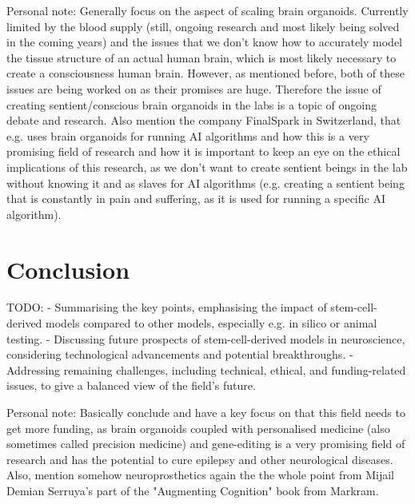 \documentclass[10pt]{article}
\begin{document}
\begin{sloppypar}
  Personal note: Generally focus on the aspect of scaling brain organoids. Currently limited by the blood supply (still, ongoing research and most likely being solved in the coming years) and the issues that we don't know how to accurately model the tissue structure of an actual human brain, which is most likely necessary to create a consciousness human brain. However, as mentioned before, both of these issues are being worked on as their promises are huge. Therefore the issue of creating sentient/conscious brain organoids in the labs is a topic of ongoing debate and research. Also mention the company FinalSpark in Switzerland, that e.g. uses brain organoids for running AI algorithms and how this is a very promising field of research and how it is important to keep an eye on the ethical implications of this research, as we don't want to create sentient beings in the lab without knowing it and as slaves for AI algorithms (e.g. creating a sentient being that is constantly in pain and suffering, as it is used for running a specific AI algorithm).

  \section{Conclusion}
  \label{sec:conclusion}

  TODO:
  - Summarising the key points, emphasising the impact of stem-cell-derived models compared to other models, especially e.g. in silico or animal testing.
  - Discussing future prospects of stem-cell-derived models in neuroscience, considering technological advancements and potential breakthroughs.
  - Addressing remaining challenges, including technical, ethical, and funding-related issues, to give a balanced view of the field's future.

  Personal note: Basically conclude and have a key focus on that this field needs to get more funding, as brain organoids coupled with personalised medicine (also sometimes called precision medicine) and gene-editing is a very promising field of research and has the potential to cure epilepsy and other neurological diseases. Also, mention somehow neuroprosthetics again the the whole point from Mijail Demian Serruya's part of the "Augmenting Cognition" book from Markram.


  \pagebreak
  
  

\end{sloppypar}
\end{document}
